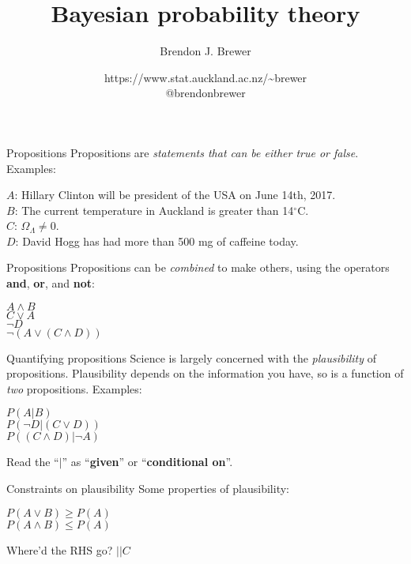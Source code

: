 \documentclass{beamer}
\author{Brendon J. Brewer}
\title{Bayesian probability theory}
\institute{Department of Statistics, The University of Auckland}
\date{{\color{blue} https://www.stat.auckland.ac.nz/\~{ }brewer}\\
\vspace{10pt}
{\color{blue} @brendonbrewer}}
\begin{document}
\begin{frame}[t,plain]
\titlepage
\end{frame}

\begin{frame}[t]{Propositions}
Propositions are {\it statements that can be either true or false}.\\
Examples:\vspace{20pt}

$A$: {\small Hillary Clinton will be president of the USA on June 14th, 2017.}\\
$B$: {\small The current temperature in Auckland is greater than 14$^{\circ}$C.}\\
$C$: {\small $\Omega_\Lambda \neq 0$.}\\
$D$: {\small David Hogg has had more than 500 mg of caffeine today.}
\end{frame}

\begin{frame}[t]{Propositions}
Propositions can be {\it combined} to make others, using the operators
{\bf and}, {\bf or}, and {\bf not}: \vspace{20pt}

$A \wedge B$\\
$C \vee A$\\
$\neg D$\\
$\neg (A \vee (C \wedge D))$
\end{frame}

\begin{frame}[t]{Quantifying propositions}
Science is largely concerned with the {\it plausibility} of propositions.
Plausibility depends on the information you have, so is a function of {\it
two} propositions. Examples:\vspace{20pt}

$P(A | B)$\\
$P(\neg D | (C \vee D))$\\
$P((C \wedge D) | \neg A)$\vspace{20pt}

Read the ``$|$'' as ``{\bf given}'' or ``{\bf conditional on}''.
\end{frame}


\begin{frame}[t]{Constraints on plausibility}
Some properties of plausibility:\vspace{20pt}

$P(A \vee B) \geq P(A)$\\
$P(A \wedge B) \leq P(A)$\vspace{20pt}


Where'd the RHS go? $|| C$
\end{frame}
\end{document}
